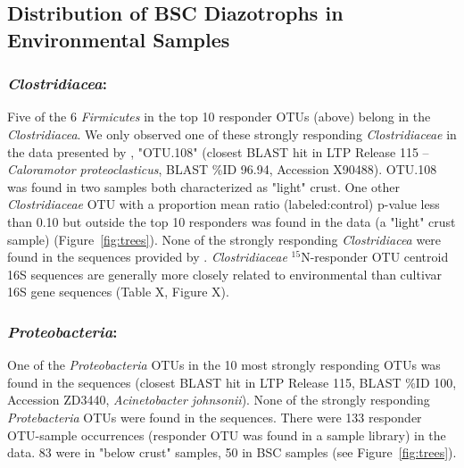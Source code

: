 \subsection{Distribution of BSC Diazotrophs in Environmental Samples}
\subsubsection{\textbf{\textit{Clostridiacea}:}} Five of the 6
\textit{Firmicutes} in the top 10 responder OTUs (above) belong in the
\textit{Clostridiacea}. We only observed one of these strongly responding
\textit{Clostridiaceae} in the data presented by \citet{Garcia_Pichel_2013},
"OTU.108" (closest BLAST hit in LTP Release 115 -- \textit{Caloramotor
proteoclasticus}, BLAST \%ID 96.94, Accession X90488).  OTU.108 was found in
two samples both characterized as "light" crust. One other
\textit{Clostridiaceae} OTU with a proportion mean ratio (labeled:control)
p-value less than 0.10 but outside the top 10 responders was found in the
\citet{Garcia_Pichel_2013} data (a "light" crust sample) (Figure~\ref{fig:trees}). 
None of the strongly responding \textit{Clostridiacea} were found in the
sequences provided by \citet{Steven_2013}. \textit{Clostridiaceae}
$^{15}$N-responder OTU centroid 16S sequences are generally more closely
related to environmental than cultivar 16S gene sequences (Table X, Figure X).   

\subsubsection{\textbf{\textit{Proteobacteria}:}} One of the
\textit{Proteobacteria} OTUs in the 10 most strongly responding OTUs was
found in the \citet{Garcia_Pichel_2013} sequences (closest
BLAST hit in LTP Release 115, BLAST \%ID 100, Accession ZD3440,
\textit{Acinetobacter johnsonii}). None of the strongly responding
\textit{Protebacteria} OTUs were found in the \citet{Steven_2013} sequences.
There were 133 responder OTU-sample occurrences (responder OTU was found in a
sample library) in the \citet{Steven_2013} data.  83 were in "below crust"
samples, 50 in BSC samples (see Figure~\ref{fig:trees}).


